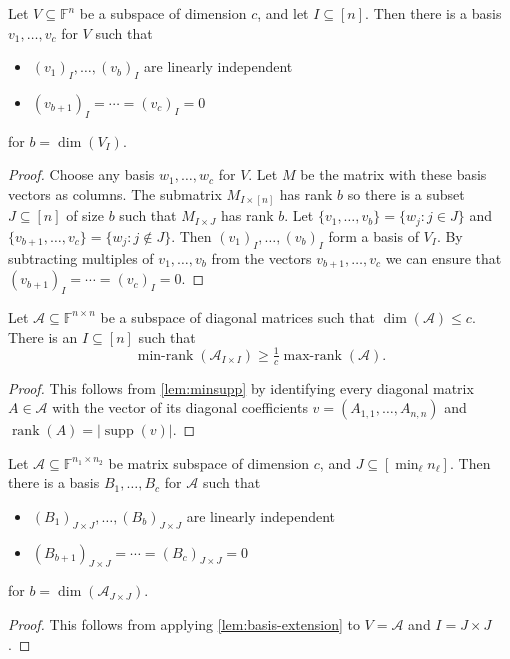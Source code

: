 \documentclass{daj}
\DeclareMathOperator{\supp}{supp}
\newcommand{\FF}{\mathbb{F}}
\DeclareMathOperator{\rank}{rank} \DeclareMathOperator{\col}{colspan}
\DeclareMathOperator{\maxrank}{max-rank}
\DeclareMathOperator{\minrank}{min-rank}
\begin{document}
\begin{lemma}\label{lem:basis-extension}
    Let $V \subseteq \FF^n$ be a subspace of dimension $c$, and let $I \subseteq [n]$. Then there is a basis $v_1, \ldots, v_c$ for $V$ such that 
    \begin{itemize}
        \item $(v_1)_I, \ldots, (v_b)_I$ are linearly independent
        \item $(v_{b+1})_I = \cdots = (v_c)_I = 0$
    \end{itemize}
    for $b = \dim(V_I)$.
\end{lemma}
\begin{proof}
    Choose any basis $w_1, \ldots, w_c$ for $V$. Let $M$ be the matrix with these basis vectors as columns. The submatrix $M_{I \times[n]}$ has rank $b$ so there is a subset $J \subseteq [n]$ of size $b$ such that $M_{I \times J}$ has rank $b$.
    Let $\{v_1, \ldots, v_b\} = \{w_j : j \in J\}$ and $\{v_{b+1}, \ldots, v_c\} = \{w_j : j \not\in J\}$.
    Then $(v_1)_I, \ldots, (v_b)_I$ form a basis of $V_I$. By subtracting multiples of $v_1, \ldots, v_b$ from the vectors $v_{b+1}, \ldots, v_c$ we can ensure that $(v_{b+1})_I = \cdots = (v_c)_I = 0$.
\end{proof}

\begin{lemma}\label{lem:large-minrank}
    Let $\mathcal{A} \subseteq \FF^{n \times n}$ be a subspace of diagonal matrices such that $\dim(\mathcal{A}) \leq c$. There is an $I \subseteq [n]$ such that 
    \[
    \minrank(\mathcal{A}_{I\times I}) \geq \tfrac1c \maxrank(\mathcal{A}).
    \]
\end{lemma}
\begin{proof}
    This follows from \autoref{lem:minsupp} by identifying every diagonal matrix $A \in \mathcal{A}$ with the vector of its diagonal coefficients $v = (A_{1,1}, \ldots, A_{n,n})$ and $\rank(A) = |\supp(v)|$.
\end{proof}

\begin{lemma}\label{lem:basis-extension-matrices}
    Let $\mathcal{A} \subseteq \FF^{n_1 \times n_2}$ be matrix subspace of dimension $c$, and $J \subseteq [\min_\ell n_\ell]$. Then there is a basis $B_1, \ldots, B_c$ for $\mathcal{A}$ such that
    \begin{itemize}
        \item $(B_1)_{J \times J}, \ldots, (B_b)_{J \times J}$ are linearly independent
        \item $(B_{b+1})_{J \times J}= \cdots = (B_{c})_{J \times J} = 0$
    \end{itemize}
    for $b = \dim(\mathcal{A}_{J\times J})$.
\end{lemma}
\begin{proof}
This follows from applying \autoref{lem:basis-extension} to $V = \mathcal{A}$ and $I = J \times J$.
\end{proof}
\end{document}

